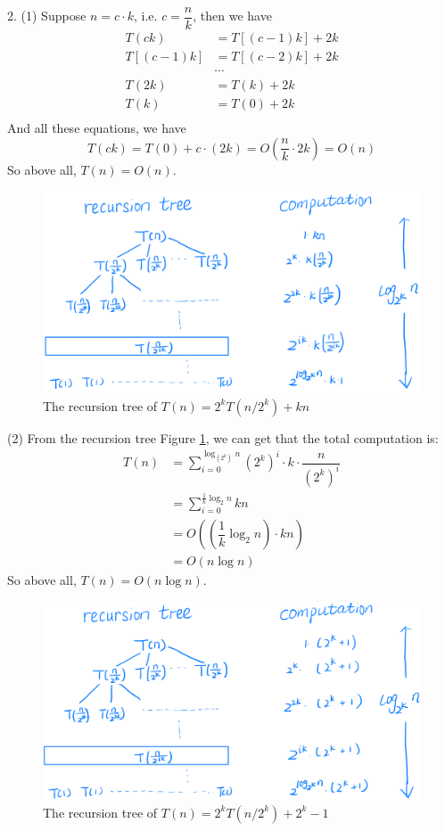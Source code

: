 2. (1) Suppose $n=c\cdot k$, i.e. $c=\dfrac{n}{k}$, then we have
\begin{align*}
    T(ck) &= T[(c-1)k]+2k\\
    T[(c-1)k] &= T[(c-2)k]+2k\\
    &\cdots\\
    T(2k) &= T(k)+2k\\
    T(k) &= T(0)+2k\\
\end{align*}
And all these equations, we have
$$T(ck)=T(0)+c\cdot (2k)=O\left(\dfrac{n}{k}\cdot 2k\right)=O(n)$$
So above all, $T(n)=O(n)$.\\

\begin{figure}[htbp]
    \centering
    \includegraphics[width=\linewidth]{./figure/t1_22.png}
    \caption{The recursion tree of $T(n) = 2^kT(n/2^k) + kn$}
    \label{fig:t1_22}
\end{figure}

(2) From the recursion tree Figure \ref{fig:t1_22}, we can get that the total computation is:
\begin{align*}
    T(n) &= \sum_{i=0}^{\log_{(2^k)}{n}}(2^k)^i\cdot k\cdot\dfrac{n}{(2^k)^i}\\
         &= \sum_{i=0}^{\frac{1}{k}\log_{2}{n}} kn\\
         &= O((\dfrac{1}{k}\log_{2}{n})\cdot kn)\\
         &= O(n\log{n})
\end{align*}
So above all, $T(n)=O(n\log n)$.\\

\begin{figure}[htbp]
    \centering
    \includegraphics[width=\linewidth]{./figure/t1_23.png}
    \caption{The recursion tree of $T(n) = 2^kT(n/2^k) + 2^k-1$}
    \label{fig:t1_23}
\end{figure}

